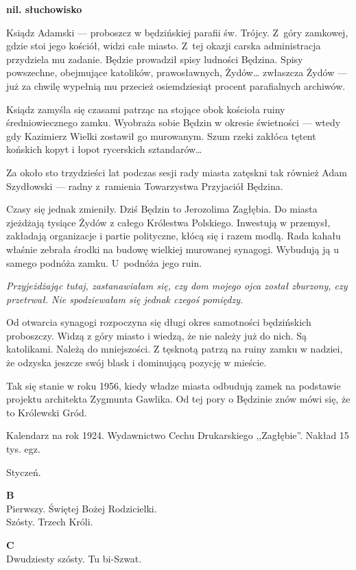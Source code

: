 \documentclass[11pt,a4paper,oneside]{article}
\begin{document}
\noindent
\textbf{nil. słuchowisko}

Ksiądz Adamski --- proboszcz w będzińskiej parafii św. Trójcy.  Z~góry
zamkowej, gdzie stoi jego kościół, widzi całe miasto.  Z~tej okazji
carska administracja przydziela mu zadanie. Będzie prowadził spisy
ludności Będzina.  Spisy powszechne, obejmujące katolików,
prawosławnych, Żydów\dots{} zwłaszcza Żydów --- już za chwilę wypełnią
mu przecież osiemdziesiąt procent parafialnych archiwów. 

Ksiądz zamyśla się czasami patrząc na stojące obok kościoła ruiny
średniowiecznego zamku. Wyobraża sobie Będzin w okresie świetności ---
wtedy gdy Kazimierz Wielki zostawił go murowanym. Szum rzeki zakłóca
tętent końskich kopyt i łopot rycerskich sztandarów\dots{}

Za około sto trzydzieści lat podczas sesji rady miasta zatęskni tak również Adam
Szydłowski --- radny z~ramienia Towarzystwa Przyjaciół Będzina.

Czasy się jednak zmieniły. Dziś Będzin to Jerozolima Zagłębia.  Do
miasta zjeżdżają tysiące Żydów z całego Królestwa Polskiego.
Inwestują w przemysł, zakładają organizacje i partie polityczne, kłócą
się i razem modlą.  Rada kahału właśnie zebrała środki na budowę
wielkiej murowanej synagogi. Wybudują ją u samego podnóża zamku.
U~podnóża jego ruin.

\emph{Przyjeżdżając tutaj, zastanawiałam się, czy dom mojego ojca został
zburzony, czy przetrwał. Nie spodziewałam się jednak czegoś pomiędzy.}

Od otwarcia synagogi rozpoczyna się długi okres samotności będzińskich
proboszczy. Widzą z góry miasto i wiedzą, że nie należy już do nich.
Są katolikami. Należą do mniejszości. Z tęsknotą patrzą na ruiny zamku
w nadziei, że odzyska jeszcze swój blask i dominującą pozycję
w mieście. 

Tak się stanie w roku 1956, kiedy władze miasta odbudują zamek na
podstawie projektu architekta Zygmunta Gawlika. Od tej pory o Będzinie
znów mówi się, że to Królewski Gród.

Kalendarz na rok 1924. Wydawnictwo Cechu Drukarskiego ,,Zagłębie''.
Nakład 15 tys. egz. 

Styczeń.

\textbf{B}\\
Pierwszy. Świętej Bożej Rodzicielki. \\
Szósty. Trzech Króli.

\textbf{C}\\
Dwudziesty szósty. Tu bi-Szwat. %
\end{document}
